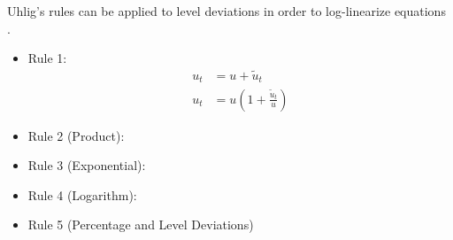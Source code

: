 \documentclass[../thesis.tex]{subfiles}
\begin{document}

\begin{lemma}\label{lemma:level-rules}
	
	Uhlig's rules can be applied to level deviations in order to log-linearize equations \cite[Lecture 9, p.9]{solis-garcia_ucb_2022}.
	
	\begin{itemize}
		\item Rule 1:
		\begin{align}
			\label{lemma:level-rule-1a}
			u_t &= u + \widetilde{u}_t \\
			\label{lemma:level-rule-1b}
			u_t &= u\left(1+ \frac{\widetilde{u}_t}{u} \right)
		\end{align}
		
		\item Rule 2 (Product):
		
		\item Rule 3 (Exponential):
		
		\item Rule 4 (Logarithm):
		
		\item Rule 5 (Percentage and Level Deviations)
		
	\end{itemize}
	
\end{lemma}



\end{document}
